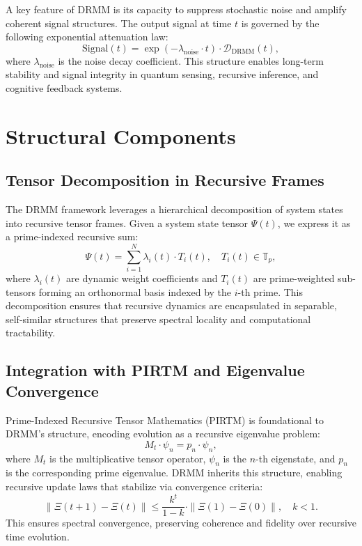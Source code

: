 \documentclass{article}
\theoremstyle{plain}
\begin{document}
A key feature of DRMM is its capacity to suppress stochastic noise and amplify coherent signal structures. The output signal at time $t$ is governed by the following exponential attenuation law:
\begin{equation}
\text{Signal}(t) = \exp(-\lambda_{\text{noise}} \cdot t) \cdot \mathcal{D}_{\text{DRMM}}(t),
\end{equation}
where $\lambda_{\text{noise}}$ is the noise decay coefficient. This structure enables long-term stability and signal integrity in quantum sensing, recursive inference, and cognitive feedback systems.

\section{Structural Components}

\subsection{Tensor Decomposition in Recursive Frames}

The DRMM framework leverages a hierarchical decomposition of system states into recursive tensor frames. Given a system state tensor $\Psi(t)$, we express it as a prime-indexed recursive sum:
\begin{equation}
\Psi(t) = \sum_{i=1}^{N} \lambda_i(t) \cdot T_i(t), \quad T_i(t) \in \mathbb{T}_p,
\end{equation}
where $\lambda_i(t)$ are dynamic weight coefficients and $T_i(t)$ are prime-weighted sub-tensors forming an orthonormal basis indexed by the $i$-th prime. This decomposition ensures that recursive dynamics are encapsulated in separable, self-similar structures that preserve spectral locality and computational tractability.

\subsection{Integration with PIRTM and Eigenvalue Convergence}

Prime-Indexed Recursive Tensor Mathematics (PIRTM) is foundational to DRMM’s structure, encoding evolution as a recursive eigenvalue problem:
\begin{equation}
M_t \cdot \psi_n = p_n \cdot \psi_n,
\end{equation}
where $M_t$ is the multiplicative tensor operator, $\psi_n$ is the $n$-th eigenstate, and $p_n$ is the corresponding prime eigenvalue. DRMM inherits this structure, enabling recursive update laws that stabilize via convergence criteria:
\begin{equation}
\| \Xi(t+1) - \Xi(t) \| \leq \frac{k^t}{1 - k} \cdot \|\Xi(1) - \Xi(0)\|, \quad k < 1.
\end{equation}
This ensures spectral convergence, preserving coherence and fidelity over recursive time evolution.
\end{document}
